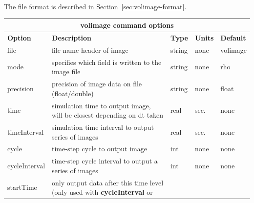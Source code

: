 \documentclass[11pt]{report}
\begin{document}
{The file format is described in Section~\ref{sec:volimage-format}.
%
\begin{center}
	\begin{tabular}{|l|p{8cm}|l|l|l|} \hline
		\multicolumn{5}{|c|}{\bf volimage command options}                                                                                             \\ \hline
		{\bf Option}   & {\bf Description}                                                                  & {\bf Type} & {\bf Units} & {\bf Default} \\ \hline
		\hline
		file           & file name header of image                                                          & string     & none        & volimage      \\ \hline
		mode           & specifies which field is written to the image file                                 & string     & none        & rho           \\  \hline
		precision      & precision of image data on file (float/double)                                     & string     & none        & float         \\ \hline
		time           & simulation time to output image, will be closest depending on dt taken             & real       & sec.        & none          \\ \hline
		timeInterval   & simulation time interval to output series of images                                & real       & sec.        & none          \\ \hline
		cycle          & time-step cycle to output image                                                    & int        & none        & none          \\ \hline
		cycleInterval  & time-step cycle interval to output a series of images                              & int        & none        & none          \\ \hline
		startTime      & only output data after this time level (only used with {\bf cycleInterval} or {\bf
}
\end{tabular}
\end{center}}
\end{document}
